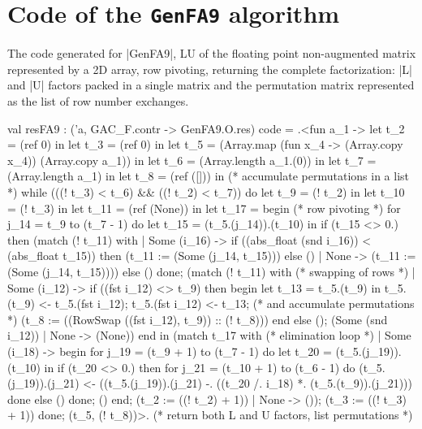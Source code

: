 \documentclass{elsart}
\begin{document}
\section{Code of the \texttt{GenFA9} algorithm}
\label{app:code-GenFA9}
The code generated for |GenFA9|, LU of the floating point
non-augmented matrix
represented by a 2D array, row pivoting, returning the complete
factorization: |L| and |U|
factors packed in a single matrix and the permutation matrix
represented as the list of row number exchanges.
\begin{code2}
val resFA9 : ('a, GAC_F.contr -> GenFA9.O.res) code =
  .<fun a_1 ->
   let t_2 = (ref 0) in
   let t_3 = (ref 0) in
   let t_5 = (Array.map (fun x_4 -> (Array.copy x_4)) (Array.copy a_1)) in
   let t_6 = (Array.length a_1.(0)) in
   let t_7 = (Array.length a_1) in
   let t_8 = (ref ([])) in  (* accumulate permutations in a list *)
   while (((! t_3) < t_6) && ((! t_2) < t_7)) do
    let t_9 = (! t_2) in
    let t_10 = (! t_3) in
    let t_11 = (ref (None)) in
    let t_17 =
     begin   (* row pivoting *)
      for j_14 = t_9 to (t_7 - 1) do
       let t_15 = (t_5.(j_14)).(t_10) in
       if (t_15 <> 0.) then
        (match (! t_11) with
         | Some (i_16) ->
            if ((abs_float (snd i_16)) < (abs_float t_15)) then
             (t_11 := (Some (j_14, t_15)))
            else ()
         | None -> (t_11 := (Some (j_14, t_15))))
       else ()
      done;
      (match (! t_11) with  (* swapping of rows *)
       | Some (i_12) ->
          if ((fst i_12) <> t_9) then begin
           let t_13 = t_5.(t_9) in
           t_5.(t_9) <- t_5.(fst i_12);
           t_5.(fst i_12) <- t_13;  (* and accumulate permutations *)
           (t_8 := ((RowSwap ((fst i_12), t_9)) :: (! t_8)))
          end else ();
          (Some (snd i_12))
       | None -> (None))
     end in
    (match t_17 with  (* elimination loop *)
     | Some (i_18) ->
        begin
         for j_19 = (t_9 + 1) to (t_7 - 1) do
          let t_20 = (t_5.(j_19)).(t_10) in
          if (t_20 <> 0.) then
           for j_21 = (t_10 + 1) to (t_6 - 1) do
            (t_5.(j_19)).(j_21) <-
             ((t_5.(j_19)).(j_21) -. ((t_20 /. i_18) *. (t_5.(t_9)).(j_21)))
           done
          else ()
         done;
         ()
        end;
        (t_2 := ((! t_2) + 1))
     | None -> ());
    (t_3 := ((! t_3) + 1))
   done;
   (t_5, (! t_8))>. (* return both L and U factors, list permutations *)
\end{code2}
\end{document}
